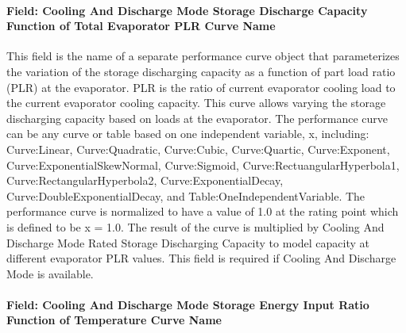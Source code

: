 \paragraph{Field: Cooling And Discharge Mode Storage Discharge Capacity Function of Total Evaporator PLR Curve Name}\label{field-cooling-and-discharge-mode-storage-discharge-capacity-function-of-total-evaporator-plr-curve-name}

This field is the name of a separate performance curve object that parameterizes the variation of the storage discharging capacity as a function of part load ratio (PLR) at the evaporator. PLR is the ratio of current evaporator cooling load to the current evaporator cooling capacity. This curve allows varying the storage discharging capacity based on loads at the evaporator. The performance curve can be any curve or table based on one independent variable, x, including: Curve:Linear, Curve:Quadratic, Curve:Cubic, Curve:Quartic, Curve:Exponent, Curve:ExponentialSkewNormal, Curve:Sigmoid, Curve:RectuangularHyperbola1, Curve:RectangularHyperbola2, Curve:ExponentialDecay, Curve:DoubleExponentialDecay, and Table:OneIndependentVariable. The performance curve is normalized to have a value of 1.0 at the rating point which is defined to be x = 1.0. The result of the curve is multiplied by Cooling And Discharge Mode Rated Storage Discharging Capacity to model capacity at different evaporator PLR values. This field is required if Cooling And Discharge Mode is available.

\paragraph{Field: Cooling And Discharge Mode Storage Energy Input Ratio Function of Temperature Curve Name}\label{field-cooling-and-discharge-mode-storage-energy-input-ratio-function-of-temperature-curve-name}

